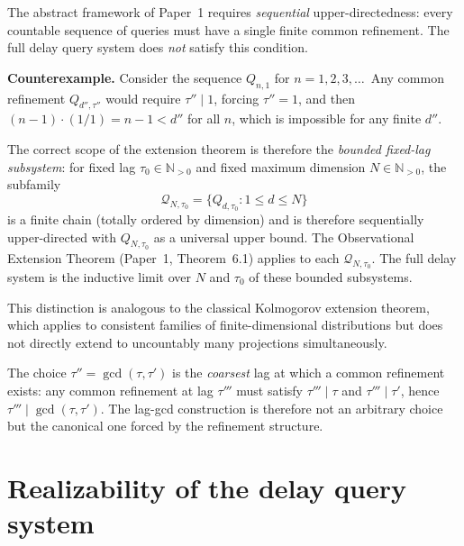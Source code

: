 \begin{remark}\label{rem:not-seq-udir}
The abstract framework of Paper~1 requires \emph{sequential} upper-directedness:
every countable sequence of queries must have a single finite common refinement.
The full delay query system does \emph{not} satisfy this condition.

\textbf{Counterexample.}  Consider the sequence $Q_{n,1}$ for $n = 1, 2, 3, \ldots$\
Any common refinement $Q_{d'', \tau''}$ would require $\tau'' \mid 1$,
forcing $\tau'' = 1$, and then $(n-1) \cdot (1/1) = n-1 < d''$ for all $n$,
which is impossible for any finite $d''$.

The correct scope of the extension theorem is therefore the
\emph{bounded fixed-lag subsystem}: for fixed lag $\tau_0 \in \mathbb{N}_{>0}$
and fixed maximum dimension $N \in \mathbb{N}_{>0}$, the subfamily
\[
  \mathcal{Q}_{N,\tau_0} = \{Q_{d,\tau_0} : 1 \leq d \leq N\}
\]
is a finite chain (totally ordered by dimension) and is therefore
sequentially upper-directed with $Q_{N,\tau_0}$ as a universal upper bound.
The Observational Extension Theorem (Paper~1, Theorem~6.1) applies to each
$\mathcal{Q}_{N,\tau_0}$.  The full delay system is the inductive limit
over $N$ and $\tau_0$ of these bounded subsystems.

This distinction is analogous to the classical Kolmogorov extension theorem,
which applies to consistent families of finite-dimensional distributions but
does not directly extend to uncountably many projections simultaneously.
\end{remark}

\begin{remark}
The choice $\tau'' = \gcd(\tau, \tau')$ is the \emph{coarsest} lag at
which a common refinement exists: any common refinement at lag $\tau'''$
must satisfy $\tau''' \mid \tau$ and $\tau''' \mid \tau'$, hence
$\tau''' \mid \gcd(\tau,\tau')$.  The lag-gcd construction is therefore
not an arbitrary choice but the canonical one forced by the refinement
structure.
\end{remark}

\section[Realizability]{Realizability of the delay query system}\label{sec:realizability}

